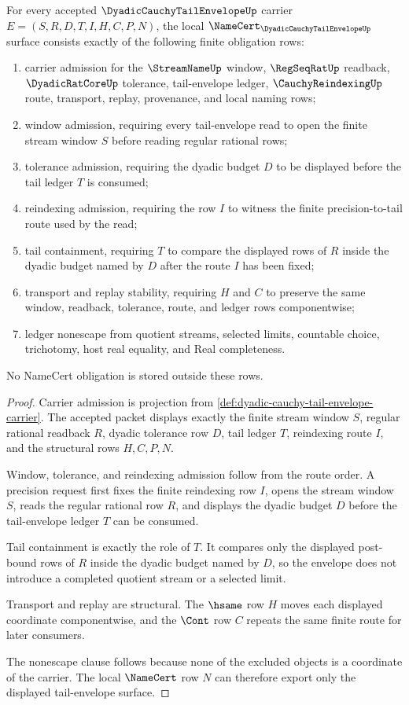 \begin{theorem}
\label{thm:dyadic-cauchy-tail-envelope-namecert-obligations}
For every accepted $\DyadicCauchyTailEnvelopeUp$ carrier $E=(S,R,D,T,I,H,C,P,N)$, the local $\NameCert_{\DyadicCauchyTailEnvelopeUp}$ surface consists exactly of the following finite obligation rows:
\begin{enumerate}
\item carrier admission for the $\StreamNameUp$ window, $\RegSeqRatUp$ readback, $\DyadicRatCoreUp$ tolerance, tail-envelope ledger, $\CauchyReindexingUp$ route, transport, replay, provenance, and local naming rows;
\item window admission, requiring every tail-envelope read to open the finite stream window $S$ before reading regular rational rows;
\item tolerance admission, requiring the dyadic budget $D$ to be displayed before the tail ledger $T$ is consumed;
\item reindexing admission, requiring the row $I$ to witness the finite precision-to-tail route used by the read;
\item tail containment, requiring $T$ to compare the displayed rows of $R$ inside the dyadic budget named by $D$ after the route $I$ has been fixed;
\item transport and replay stability, requiring $H$ and $C$ to preserve the same window, readback, tolerance, route, and ledger rows componentwise;
\item ledger nonescape from quotient streams, selected limits, countable choice, trichotomy, host real equality, and Real completeness.
\end{enumerate}
No NameCert obligation is stored outside these rows.
\end{theorem}
\begin{proof}
Carrier admission is projection from \autoref{def:dyadic-cauchy-tail-envelope-carrier}. The accepted packet displays exactly the finite stream window $S$, regular rational readback $R$, dyadic tolerance row $D$, tail ledger $T$, reindexing route $I$, and the structural rows $H,C,P,N$.

Window, tolerance, and reindexing admission follow from the route order. A precision request first fixes the finite reindexing row $I$, opens the stream window $S$, reads the regular rational row $R$, and displays the dyadic budget $D$ before the tail-envelope ledger $T$ can be consumed.

Tail containment is exactly the role of $T$. It compares only the displayed post-bound rows of $R$ inside the dyadic budget named by $D$, so the envelope does not introduce a completed quotient stream or a selected limit.

Transport and replay are structural. The $\hsame$ row $H$ moves each displayed coordinate componentwise, and the $\Cont$ row $C$ repeats the same finite route for later consumers.

The nonescape clause follows because none of the excluded objects is a coordinate of the carrier. The local $\NameCert$ row $N$ can therefore export only the displayed tail-envelope surface.
\end{proof}
